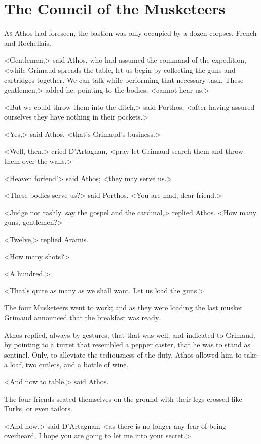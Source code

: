 
\chapter{The Council of the Musketeers}

\lettrine{A}{s} Athos had foreseen, the bastion was only occupied by a dozen corpses, French and Rochellais. 

\zz
<Gentlemen,> said Athos, who had assumed the command of the expedition, <while Grimaud spreads the table, let us begin by collecting the guns and cartridges together. We can talk while performing that necessary task. These gentlemen,> added he, pointing to the bodies, <cannot hear us.> 

<But we could throw them into the ditch,> said Porthos, <after having assured ourselves they have nothing in their pockets.> 

<Yes,> said Athos, <that's Grimaud's business.> 

<Well, then,> cried D'Artagnan, <pray let Grimaud search them and throw them over the walls.> 

<Heaven forfend!> said Athos; <they may serve us.> 

<These bodies serve us?> said Porthos. <You are mad, dear friend.> 

<Judge not rashly, say the gospel and the cardinal,> replied Athos. <How many guns, gentlemen?> 

<Twelve,> replied Aramis. 

<How many shots?> 

<A hundred.> 

<That's quite as many as we shall want. Let us load the guns.> 

The four Musketeers went to work; and as they were loading the last musket Grimaud announced that the breakfast was ready. 

Athos replied, always by gestures, that that was well, and indicated to Grimaud, by pointing to a turret that resembled a pepper caster, that he was to stand as sentinel. Only, to alleviate the tediousness of the duty, Athos allowed him to take a loaf, two cutlets, and a bottle of wine. 

<And now to table,> said Athos. 

The four friends seated themselves on the ground with their legs crossed like Turks, or even tailors. 

<And now,> said D'Artagnan, <as there is no longer any fear of being overheard, I hope you are going to let me into your secret.> 

